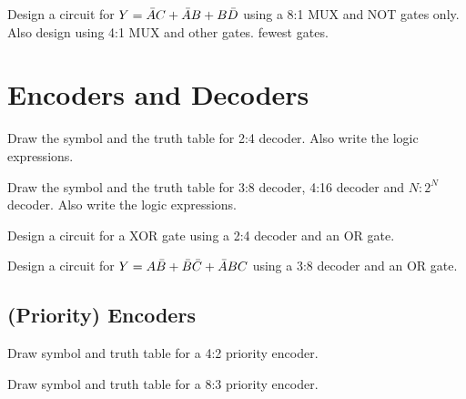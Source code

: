 \begin{example}
  Design a circuit for $Y = \bar{A} C + \bar{A} B + B \bar{D} $ using a 8:1 MUX and NOT
  gates only. Also design using 4:1 MUX and other gates.
   fewest gates.
\end{example}
\vspace{10em}

\section{Encoders and Decoders}

\begin{example}
Draw the symbol and the truth table for 2:4 decoder. Also write the logic expressions.
\end{example}
\vspace{10em}

\begin{example}
  Draw the symbol and the truth table for 3:8 decoder, 4:16 decoder and $N:2^N$ decoder. Also write the logic expressions.
\end{example}
\vspace{10em}

\begin{example}
Design a circuit for a XOR gate using a 2:4 decoder and an OR gate.
\end{example}
\vspace{10em}

\begin{example}
  Design a circuit for $Y = A\bar{B} + \bar{B} \bar{C} + \bar{A} B C$ using a 3:8 decoder and an
  OR gate.
\end{example}
\vspace{10em}


\subsection{(Priority) Encoders}

\begin{example}
  Draw symbol and truth table for a 4:2 priority encoder. 
\end{example}
\vspace{10em}

\begin{example}
  Draw symbol and truth table for a 8:3 priority encoder. 
\end{example}
\vspace{10em}
